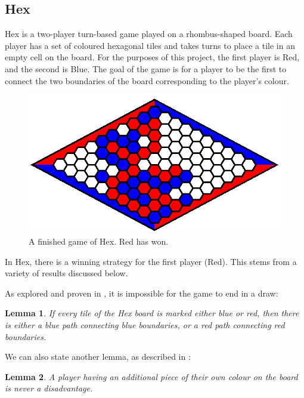 

\newtheorem{lemma}{Lemma}[subsection]
\newtheorem{thm}{Theorem}[subsection]
\newtheorem{defn}{Definition}[subsection]
\subsection{Hex}
Hex is a two-player turn-based game played on a rhombus-shaped board. Each player has a set of coloured hexagonal tiles and takes turns to place a tile in an empty cell on the board. For the purposes of this project, the first player is Red, and the second is Blue. The goal of the game is for a player to be the first to connect the two boundaries of the board corresponding to the player's colour.

\begin{figure}
    \centering
    \includegraphics[scale = 0.4]{images/HEX_GAME.png}
    \caption{A finished game of Hex. Red has won.}
    \label{fig:hex_game}
\end{figure}

In Hex, there is a winning strategy for the first player (Red). This stems from a variety of results discussed below.

As explored and proven in \cite{GameOfHex}, it is impossible for the game to end in a draw:

\begin{lemma}If every tile of the Hex board is marked either blue or red, then there is either a blue path connecting blue boundaries, or a red path connecting red boundaries.\end{lemma}


We can also state another lemma, as described in \cite{MCTSHex}:

\begin{lemma}A player having an additional piece of their own colour on the board is never a disadvantage.\end{lemma}



